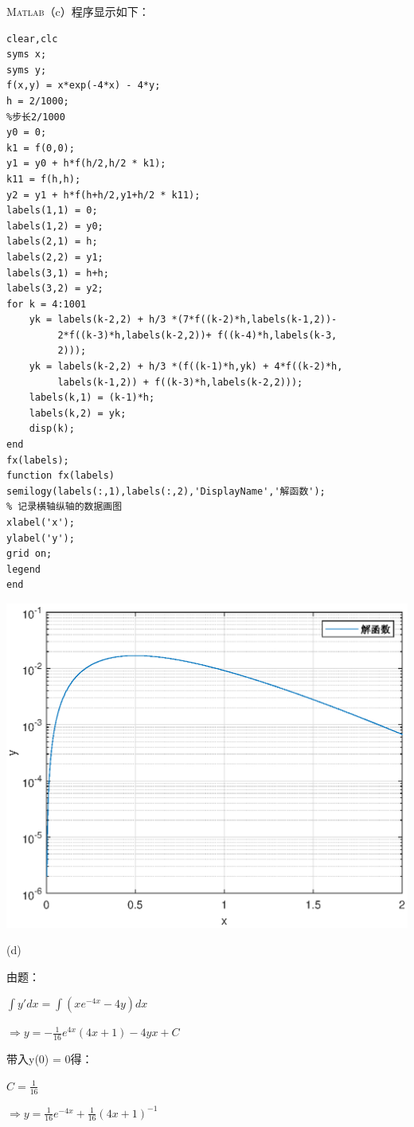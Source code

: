 \documentclass[12pt,a4paper,UTF8]{ctexart}
\begin{document}
\begin{enumerate}
\textsc{Matlab}（c）程序显示如下：
\begin{lstlisting}[frame=single]
clear,clc
syms x;
syms y;
f(x,y) = x*exp(-4*x) - 4*y;
h = 2/1000;
%步长2/1000
y0 = 0;
k1 = f(0,0);
y1 = y0 + h*f(h/2,h/2 * k1);
k11 = f(h,h);
y2 = y1 + h*f(h+h/2,y1+h/2 * k11);
labels(1,1) = 0;
labels(1,2) = y0;
labels(2,1) = h;
labels(2,2) = y1;
labels(3,1) = h+h;
labels(3,2) = y2;
for k = 4:1001
    yk = labels(k-2,2) + h/3 *(7*f((k-2)*h,labels(k-1,2))- 
         2*f((k-3)*h,labels(k-2,2))+ f((k-4)*h,labels(k-3,
         2)));
    yk = labels(k-2,2) + h/3 *(f((k-1)*h,yk) + 4*f((k-2)*h,
         labels(k-1,2)) + f((k-3)*h,labels(k-2,2)));
    labels(k,1) = (k-1)*h;
    labels(k,2) = yk;
    disp(k);
end
fx(labels);
function fx(labels)
semilogy(labels(:,1),labels(:,2),'DisplayName','解函数');
% 记录横轴纵轴的数据画图
xlabel('x');
ylabel('y');
grid on;
legend
end
\end{lstlisting}
\begin{center}
\includegraphics[scale=1]{3c.eps}
\end{center}

(d)

由题：

$\int y'dx = \int (xe^{-4x} - 4y)dx$

$\Rightarrow y = -\frac{1}{16}e^{4x}(4x + 1) - 4yx + C$

带入y(0) = 0得：

$C = \frac{1}{16}$

$\Rightarrow y = \frac{1}{16}e^{-4x} + \frac{1}{16}(4x+1)^{-1}$


\end{enumerate}
\end{document}
